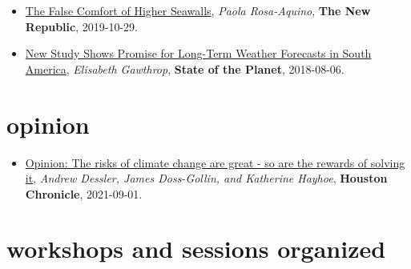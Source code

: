 \documentclass[10pt,oneside]{article}
\begin{document}
\mbox{}\vspace{-\dimexpr\baselineskip\relax}

\begin{itemize}[label={}]
  
  \item \href{https://newrepublic.com/article/155519/false-comfort-higher-seawalls}{The False Comfort of Higher Seawalls}, \textit{Paola Rosa-Aquino}, \textbf{The New Republic}, 2019-10-29.
        
  \item \href{https://blogs.ei.columbia.edu/2018/08/06/subseasonal-weather-forecasts-paraguay/}{New Study Shows Promise for Long-Term Weather Forecasts in South America}, \textit{Elisabeth Gawthrop}, \textbf{State of the Planet}, 2018-08-06.
        
\end{itemize}

\section{opinion}

\mbox{}\vspace{-\dimexpr\baselineskip\relax}

\begin{itemize}[label={}]
  
  \item \href{https://www.houstonchronicle.com/opinion/outlook/article/Opinion-The-risks-of-climate-change-are-great-16426616.php}{Opinion: The risks of climate change are great - so are the rewards of solving it}, \textit{Andrew Dessler, James Doss-Gollin, and Katherine Hayhoe}, \textbf{Houston Chronicle}, 2021-09-01.
        
\end{itemize}


\section{workshops and sessions organized}

\mbox{}\vspace{-\dimexpr\baselineskip\relax}
\end{document}
